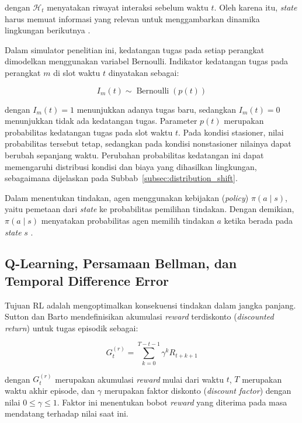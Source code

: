 dengan $\mathcal{H}_t$ menyatakan riwayat interaksi sebelum waktu $t$. Oleh karena itu, \textit{state} harus memuat informasi yang relevan untuk menggambarkan dinamika lingkungan berikutnya \cite{suttonbarto2018}.

Dalam simulator penelitian ini, kedatangan tugas pada setiap perangkat dimodelkan menggunakan variabel Bernoulli. Indikator kedatangan tugas pada perangkat $m$ di slot waktu $t$ dinyatakan sebagai:

\begin{equation}
\label{eq:bernoulli_arrival}
I_m(t)\sim \operatorname{Bernoulli}(p(t))
\end{equation}

dengan $I_m(t)=1$ menunjukkan adanya tugas baru, sedangkan $I_m(t)=0$ menunjukkan tidak ada kedatangan tugas. Parameter $p(t)$ merupakan probabilitas kedatangan tugas pada slot waktu $t$. Pada kondisi stasioner, nilai probabilitas tersebut tetap, sedangkan pada kondisi nonstasioner nilainya dapat berubah sepanjang waktu. Perubahan probabilitas kedatangan ini dapat memengaruhi distribusi kondisi dan biaya yang dihasilkan lingkungan, sebagaimana dijelaskan pada Subbab~\ref{subsec:distribution_shift}.

Dalam menentukan tindakan, agen menggunakan kebijakan (\textit{policy}) $\pi(a\mid s)$, yaitu pemetaan dari \textit{state} ke probabilitas pemilihan tindakan. Dengan demikian, $\pi(a\mid s)$ menyatakan probabilitas agen memilih tindakan $a$ ketika berada pada \textit{state} $s$ \cite{suttonbarto2018}.

\vspace{1cm}
\subsection{Q-Learning, Persamaan Bellman, dan Temporal Difference Error}
\label{subsec:q_learning_bellman_td_error}

Tujuan RL adalah mengoptimalkan konsekuensi tindakan dalam jangka panjang. Sutton dan Barto \cite{suttonbarto2018} mendefinisikan akumulasi \textit{reward} terdiskonto (\textit{discounted return}) untuk tugas episodik sebagai:

\begin{equation}
\label{eq:reward_return}
G_t^{(r)}
=
\sum_{k=0}^{T-t-1}
\gamma^k R_{t+k+1}
\end{equation}

dengan $G_t^{(r)}$ merupakan akumulasi \textit{reward} mulai dari waktu $t$, $T$ merupakan waktu akhir episode, dan $\gamma$ merupakan faktor diskonto (\textit{discount factor}) dengan nilai $0\leq\gamma\leq1$. Faktor ini menentukan bobot \textit{reward} yang diterima pada masa mendatang terhadap nilai saat ini.

